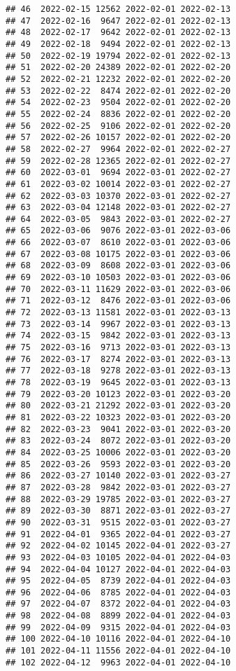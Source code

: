 \documentclass[
]{article}
\begin{document}
\begin{verbatim}
## 46  2022-02-15 12562 2022-02-01 2022-02-13
## 47  2022-02-16  9647 2022-02-01 2022-02-13
## 48  2022-02-17  9642 2022-02-01 2022-02-13
## 49  2022-02-18  9494 2022-02-01 2022-02-13
## 50  2022-02-19 19794 2022-02-01 2022-02-13
## 51  2022-02-20 24389 2022-02-01 2022-02-20
## 52  2022-02-21 12232 2022-02-01 2022-02-20
## 53  2022-02-22  8474 2022-02-01 2022-02-20
## 54  2022-02-23  9504 2022-02-01 2022-02-20
## 55  2022-02-24  8836 2022-02-01 2022-02-20
## 56  2022-02-25  9106 2022-02-01 2022-02-20
## 57  2022-02-26 10157 2022-02-01 2022-02-20
## 58  2022-02-27  9964 2022-02-01 2022-02-27
## 59  2022-02-28 12365 2022-02-01 2022-02-27
## 60  2022-03-01  9694 2022-03-01 2022-02-27
## 61  2022-03-02 10014 2022-03-01 2022-02-27
## 62  2022-03-03 10370 2022-03-01 2022-02-27
## 63  2022-03-04 12148 2022-03-01 2022-02-27
## 64  2022-03-05  9843 2022-03-01 2022-02-27
## 65  2022-03-06  9076 2022-03-01 2022-03-06
## 66  2022-03-07  8610 2022-03-01 2022-03-06
## 67  2022-03-08 10175 2022-03-01 2022-03-06
## 68  2022-03-09  8608 2022-03-01 2022-03-06
## 69  2022-03-10 10503 2022-03-01 2022-03-06
## 70  2022-03-11 11629 2022-03-01 2022-03-06
## 71  2022-03-12  8476 2022-03-01 2022-03-06
## 72  2022-03-13 11581 2022-03-01 2022-03-13
## 73  2022-03-14  9967 2022-03-01 2022-03-13
## 74  2022-03-15  9842 2022-03-01 2022-03-13
## 75  2022-03-16  9713 2022-03-01 2022-03-13
## 76  2022-03-17  8274 2022-03-01 2022-03-13
## 77  2022-03-18  9278 2022-03-01 2022-03-13
## 78  2022-03-19  9645 2022-03-01 2022-03-13
## 79  2022-03-20 10123 2022-03-01 2022-03-20
## 80  2022-03-21 21292 2022-03-01 2022-03-20
## 81  2022-03-22 10323 2022-03-01 2022-03-20
## 82  2022-03-23  9041 2022-03-01 2022-03-20
## 83  2022-03-24  8072 2022-03-01 2022-03-20
## 84  2022-03-25 10006 2022-03-01 2022-03-20
## 85  2022-03-26  9593 2022-03-01 2022-03-20
## 86  2022-03-27 10140 2022-03-01 2022-03-27
## 87  2022-03-28  9842 2022-03-01 2022-03-27
## 88  2022-03-29 19785 2022-03-01 2022-03-27
## 89  2022-03-30  8871 2022-03-01 2022-03-27
## 90  2022-03-31  9515 2022-03-01 2022-03-27
## 91  2022-04-01  9365 2022-04-01 2022-03-27
## 92  2022-04-02 10145 2022-04-01 2022-03-27
## 93  2022-04-03 10105 2022-04-01 2022-04-03
## 94  2022-04-04 10127 2022-04-01 2022-04-03
## 95  2022-04-05  8739 2022-04-01 2022-04-03
## 96  2022-04-06  8785 2022-04-01 2022-04-03
## 97  2022-04-07  8372 2022-04-01 2022-04-03
## 98  2022-04-08  8899 2022-04-01 2022-04-03
## 99  2022-04-09  9315 2022-04-01 2022-04-03
## 100 2022-04-10 10116 2022-04-01 2022-04-10
## 101 2022-04-11 11556 2022-04-01 2022-04-10
## 102 2022-04-12  9963 2022-04-01 2022-04-10

\end{verbatim}
\end{document}
